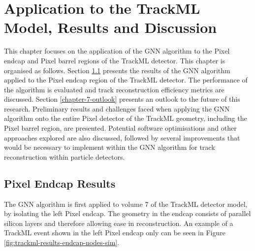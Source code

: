 
\chapter{Application to the TrackML Model, Results and Discussion}
\label{chapter-7}

This chapter focuses on the application of the GNN algorithm to the Pixel endcap and Pixel barrel regions of the TrackML detector. This chapter is organised as follows. Section \ref{chapter-7-endcap-results} presents the results of the GNN algorithm applied to the Pixel endcap region of the TrackML detector. The performance of the algorithm is evaluated and track reconstruction efficiency metrics are discussed. Section \ref{chapter-7-outlook} presents an outlook to the future of this research. Preliminary results and challenges faced when applying the GNN algorithm onto the entire Pixel detector of the TrackML geometry, including the Pixel barrel region, are presented. Potential software optimisations and other approaches explored are also discussed, followed by several improvements that would be necessary to implement within the GNN algorithm for track reconstruction within particle detectors.





\section{Pixel Endcap Results}
\label{chapter-7-endcap-results}

The GNN algorithm is first applied to volume 7 of the TrackML detector model, by isolating the left Pixel endcap. The geometry in the endcap consists of parallel silicon layers and therefore allowing ease in reconstruction. An example of a TrackML event shown in the left Pixel endcap only can be seen in Figure \ref{fig:trackml-results-endcap-nodes-sim}.

